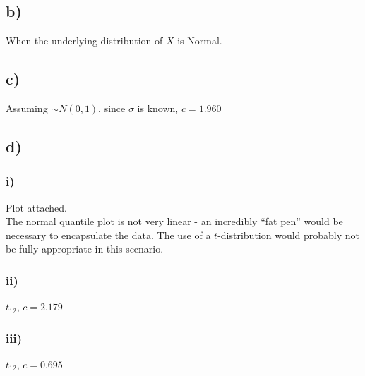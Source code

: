 \documentclass[]{article}
\begin{document}
\subsection{b)}
When the underlying distribution of $X$ is Normal.

\subsection{c)}
Assuming $\sim N(0,1)$, since $\sigma$ is known, $c=1.960$

\subsection{d)}
\subsubsection{i)}
Plot attached.
\\
The normal quantile plot is not very linear - an incredibly ``fat pen'' would be necessary to encapsulate the data. The use of a $t$-distribution would probably not be fully appropriate in this scenario.
\subsubsection{ii)}
$t_{12}$, $c = 2.179$
\subsubsection{iii)}
$t_{12}$, $c = 0.695$
\end{document}

